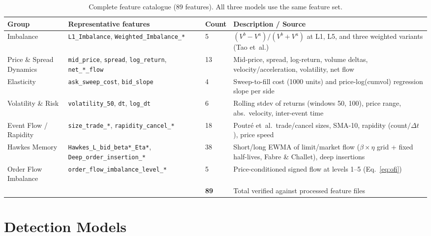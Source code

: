 \documentclass[11pt]{report}
\begin{document}
\begin{table}[H]
\centering
\caption{Complete feature catalogue (89 features). All three models use the same feature set.}
\label{tab:feature_catalogue}
\small
\begin{tabular}{p{} p{} p{} p{}}
\toprule
\textbf{Group} & \textbf{Representative features} & \textbf{Count} & \textbf{Description / Source} \\
\midrule
Imbalance & \texttt{L1\_Imbalance}, \texttt{Weighted\_Imbalance\_*} & 5 & $(V^b - V^a)/(V^b + V^a)$ at L1, L5, and three weighted variants (Tao et~al.) \\
\addlinespace
Price \& Spread Dynamics & \texttt{mid\_price}, \texttt{spread}, \texttt{log\_return}, \texttt{net\_*\_flow} & 13 & Mid-price, spread, log-return, volume deltas, velocity/acceleration, volatility, net flow \\
\addlinespace
Elasticity & \texttt{ask\_sweep\_cost}, \texttt{bid\_slope} & 4 & Sweep-to-fill cost (1000 units) and price-log(cumvol) regression slope per side \\
\addlinespace
Volatility \& Risk & \texttt{volatility\_50}, \texttt{dt}, \texttt{log\_dt} & 6 & Rolling stdev of returns (windows 50, 100), price range, abs.\ velocity, inter-event time \\
\addlinespace
Event Flow / Rapidity & \texttt{size\_trade\_*}, \texttt{rapidity\_cancel\_*} & 18 & Poutré et~al.\ trade/cancel sizes, SMA-10, rapidity (count$/\Delta t$), price speed \\
\addlinespace
Hawkes Memory & \texttt{Hawkes\_L\_bid\_beta*\_Eta*}, \texttt{Deep\_order\_insertion\_*} & 38 & Short/long EWMA of limit/market flow ($\beta \times \eta$ grid + fixed half-lives, Fabre \& Challet), deep insertions \\
\addlinespace
Order Flow Imbalance & \texttt{order\_flow\_imbalance\_level\_*} & 5 & Price-conditioned signed flow at levels 1--5 (Eq.~\eqref{eq:ofi}) \\
\addlinespace
\midrule
& & \textbf{89} & Total verified against processed feature files \\
\bottomrule
\end{tabular}
\end{table}

\section{Detection Models}\label{sec:methodology:models}
\end{document}
